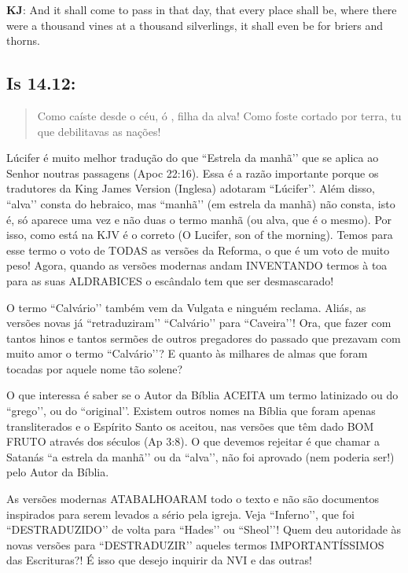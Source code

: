 \textbf{KJ}: And it shall come to pass in that day, that every place shall be, where there were a thousand vines at a thousand silverlings, it shall even be for briers and thorns.

\subsection*{Is 14.12:} 
 \begin{quote}
 \small
 Como caíste desde o céu, ó , filha da alva! Como foste cortado por terra, tu que debilitavas as nações!
 \end{quote}

Lúcifer é muito melhor tradução do que ``Estrela da manhã’’ que se aplica ao Senhor noutras passagens (Apoc 22:16). Essa é a razão importante porque os tradutores da King James Version (Inglesa) adotaram ``Lúcifer’’. Além disso, ``alva’’ consta do hebraico, mas ``manhã’’ (em estrela da manhã) não consta, isto é, só aparece uma
vez e não duas o termo manhã (ou alva, que é o mesmo). Por isso, como
está na KJV é o correto (O Lucifer, son of the morning). Temos para
esse termo o voto de TODAS as versões da Reforma, o que é um voto de
muito peso! Agora, quando as versões modernas andam INVENTANDO termos
à toa para as suas ALDRABICES o escândalo tem que ser desmascarado!

O termo ``Calvário’’ também vem da Vulgata e ninguém reclama. Aliás, as
versões novas já ``retraduziram’’ ``Calvário’’ para ``Caveira’’! Ora, que
fazer com tantos hinos e tantos sermões de outros pregadores do
passado que prezavam com muito amor o termo ``Calvário’’? E quanto às
milhares de almas que foram tocadas por aquele nome tão solene?

O que interessa é saber se o Autor da Bíblia ACEITA um termo
latinizado ou do ``grego’’, ou do ``original’’. Existem outros nomes na
Bíblia que foram apenas transliterados e o Espírito Santo os aceitou,
nas versões que têm dado BOM FRUTO através dos séculos (Ap 3:8). O
que devemos rejeitar é que chamar a Satanás ``a estrela da manhã’’ ou da
``alva’’, não foi aprovado (nem poderia ser!) pelo Autor da Bíblia.

As versões modernas ATABALHOARAM todo o texto e não são documentos
inspirados para serem levados a sério pela igreja. Veja ``Inferno’’, que
foi ``DESTRADUZIDO’’ de volta para ``Hades’’ ou ``Sheol’’! Quem deu
autoridade às novas versões para ``DESTRADUZIR’’ aqueles termos
IMPORTANTÍSSIMOS das Escrituras?! É isso que desejo inquirir da NVI e
das outras!

